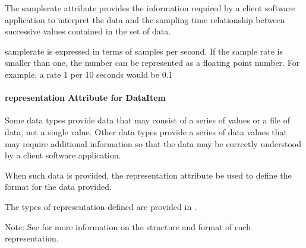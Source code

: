 \documentclass{mtconnect}	%
\begin{document}
The \gls{samplerate} attribute provides the information required by a client software application to interpret the data and the sampling time relationship between successive values contained in the set of data.

\gls{samplerate} is expressed in terms of samples per second.  If the sample rate is smaller than one, the number can be represented as a floating point number.  For example, a rate 1 per 10 seconds would be 0.1

\pagebreak

\paragraph{representation Attribute for DataItem}\label{sec:representation Attribute for DataItem}\mbox{}

Some data types provide data that may consist of a series of values or a file of data, not a single value.  Other data types provide a series of data values that may require additional information so that the data may be correctly understood by a client software application.

When such data is provided, the \gls{representation} attribute \must be used to define the format for the data provided.

The types of \gls{representation} defined are provided in .

\begin{note}
Note:  See  for more information on the structure and format of each \gls{representation}.

\end{note}
\end{document}
